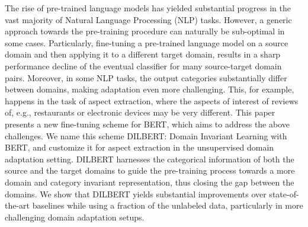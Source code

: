 The rise of pre-trained language models has yielded substantial progress in the vast majority of Natural Language Processing (NLP) tasks. However, a generic approach towards the pre-training procedure can naturally be sub-optimal in some cases. Particularly, fine-tuning a pre-trained language model on a source domain  and then applying it to a different target domain, results in a sharp performance decline of the eventual classifier for many source-target domain pairs. Moreover, in some NLP tasks, the output categories substantially differ between domains, making adaptation even more challenging. This, for example, happens in the task of aspect extraction, where the aspects of interest of reviews of, e.g., restaurants or electronic devices may be very different. This paper presents a new fine-tuning scheme for BERT, which aims to address the above challenges. We name this scheme  DILBERT: Domain Invariant Learning with BERT, and customize it  for aspect extraction in the unsupervised domain adaptation setting. DILBERT harnesses the categorical information of both the source and the target domains to guide the pre-training process towards a more domain and category invariant representation, thus closing the gap between the domains.  We show that DILBERT yields substantial improvements over state-of-the-art baselines while using a fraction of the unlabeled data, particularly in more challenging domain adaptation setups.
